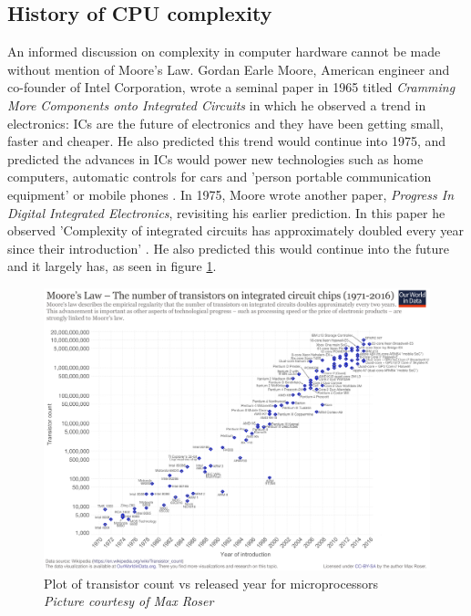 \subsection{History of CPU complexity}
An informed discussion on complexity in computer hardware cannot be made without mention of Moore's Law. Gordan Earle Moore, American engineer and co-founder of Intel Corporation, wrote a seminal paper in 1965 titled \textit{Cramming  More  Components  onto Integrated  Circuits} in which he observed a trend in electronics: ICs are the future of electronics and they have been getting small, faster and cheaper. He also predicted this trend would continue into 1975, and predicted the advances in ICs would power new technologies such as home computers, automatic controls for cars and 'person portable communication equipment' or mobile phones 
\cite{RN33}. In 1975, Moore wrote another paper, \textit{Progress In Digital Integrated Electronics}, revisiting his earlier prediction. In this paper he observed 'Complexity of integrated circuits has approximately doubled every year since their introduction' 
\cite{RN52}. He also predicted this would continue into the future and it largely has, as seen in figure \ref{tran_count_over_time}. 

\begin{figure} \begin{center}
\includegraphics[width=1\linewidth]{pics/moore_law} 
\end{center} 
\caption{Plot of transistor count vs released year for microprocessors\\ \textit{\small{Picture courtesy of  Max Roser}}}
\label{tran_count_over_time}
\end{figure}

